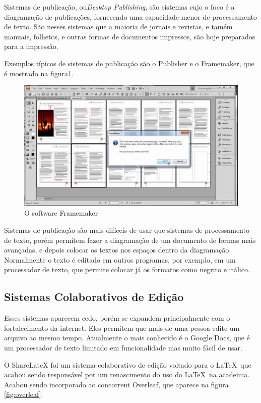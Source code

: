 Sistemas de publicação, ou\textit{Desktop Publishing}, são sistemas cujo o foco é a diagramação de publicações, fornecendo uma capacidade menor de processamento de texto. São nesses sistemas que a maioria de jornais e revistas, e tamém manuais, folhetos, e outras formas de documentos impressos, são hoje preparados para a impressão.

Exemplos típicos de sistemas de publicação são o Publisher e o Framemaker, que é mostrado na figura\ref{fig:framemaker}.

\begin{figure}[hbt]
    \centering
    \includegraphics[width=0.7\linewidth]{Images/framemaker}
    \caption[O software Framemaker]{O software Framemaker}
    \label{fig:framemaker}
\end{figure}

Sistemas de publicação são mais difíceis de usar que sistemas de processamento de texto, porém permitem fazer a diagramação de um documento de formas mais avançadas, e depois colocar os textos nos espaços dentro da diagramação. Normalmente o texto é editado em outros programas, por exemplo, em um processador de texto, que permite colocar já os formatos como negrito e itálico.


\subsection{Sistemas Colaborativos de Edição}

Esses sistemas aparecem cedo, porém se expandem principalmente com o fortalecimento da internet. Eles permitem que mais de uma pessoa edite um arquivo ao mesmo tempo. Atualmente o mais conhecido é o Google Docs, que é um processador de texto limitado em funcionalidade mas muito fácil de usar.

O ShareLateX foi um sistema colaborativo de edição voltado para o \LaTeX\ que acabou sendo responsável por um renascimento do uso do \LaTeX\  na academia. Acabou sendo incorporado ao concorrent Overleaf, que aparece na figura \ref{fig:overleaf}.

